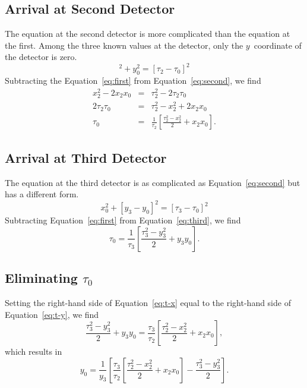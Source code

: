 \documentclass[twocolumn]{article}
\begin{document}
\subsection{Arrival at Second Detector}

The equation at the second detector is more complicated than the equation at
the first.  Among the three known values at the detector, only the
$y$~coordinate of the detector is zero.
\begin{equation}
   [x_2 - x_0]^2 + y_0^2 = [\tau_2 - \tau_0]^2
   \label{eq:second}
\end{equation}
Subtracting the Equation~\ref{eq:first} from Equation~\ref{eq:second}, we find
\begin{eqnarray}
   \nonumber x_2^2 - 2 x_2 x_0 &=& \tau_2^2 - 2 \tau_2 \tau_0\\
   \nonumber 2 \tau_2 \tau_0   &=& \tau_2^2 - x_2^2 + 2 x_2 x_0\\
   \tau_0 &=&
      \frac{1}{\tau_2} \left[\frac{\tau_2^2 - x_2^2}{2} + x_2 x_0\right].
   \label{eq:t-x}
\end{eqnarray}

\subsection{Arrival at Third Detector}

The equation at the third detector is as complicated as
Equation~\ref{eq:second} but has a different form.
\begin{equation}
   x_0^2 + [y_3 - y_0]^2 = [\tau_3 - \tau_0]^2
   \label{eq:third}
\end{equation}
Subtracting Equation~\ref{eq:first} from Equation~\ref{eq:third}, we find
\begin{equation}
   \tau_0 = \frac{1}{\tau_3} \left[ \frac{\tau_3^2 - y_3^2}{2} + y_3
   y_0\right].
   \label{eq:t-y}
\end{equation}

\subsection{Eliminating $\tau_0$}

Setting the right-hand side of Equation~\ref{eq:t-x} equal to the right-hand
side of Equation~\ref{eq:t-y}, we find
\begin{equation}
   \frac{\tau_3^2 - y_3^2}{2} + y_3 y_0 = \frac{\tau_3}{\tau_2}
   \left[\frac{\tau_2^2 - x_2^2}{2} + x_2 x_0\right],
\end{equation}
which results in
\begin{equation}
   y_0 = \frac{1}{y_3} \left[ \frac{\tau_3}{\tau_2} \left[ \frac{\tau_2^2 -
   x_2^2}{2} + x_2 x_0\right] - \frac{\tau_3^2 - y_3^2}{2} \right].
\end{equation}

%
%
%
%

\newpage


\end{document}
